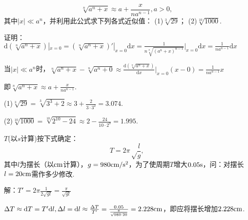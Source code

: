 \documentclass[12pt,UTF8]{ctexart}
\begin{document}
\begin{enumerate}
\[
\sqrt[n]{a^n+x}\approx a+\frac x{na^{n-1}},a>0,
\]
其中$|x|\ll a^n$，并利用此公式求下列各式近似值：
\newline
(1)$\sqrt[3]{29}$；
\newline
(2)$\sqrt[10]{1000}$.

证明：$\mathrm d(\sqrt[n]{a^n+x})|_{x=0}=(\sqrt[n]{a^n+x})'|_{x=0}\mathrm dx=\frac1{n\sqrt[n]{(a^n+x)^{n-1}}}|_{x=0}\mathrm dx=\frac1{na^{n-1}}\mathrm dx$

当$|x|\ll a^n$时，$\sqrt[n]{a^n+x}-\sqrt[n]{a^n+0}\approx\frac{\mathrm d(\sqrt[n]{a^n+x})}{\mathrm dx}|_{x=0}(x-0)=\frac1{na^{n-1}}x$

即$\sqrt[n]{a^n+x}\approx a+\frac x{na^{n-1}}$.

(1)$\sqrt[3]{29}=\sqrt[3]{3^3+2}\approx3+\frac2{3\cdot3^2}=3.074$.

(2)$\sqrt[10]{1000}=\sqrt[10]{2^{10}-24}\approx2-\frac{24}{10\cdot2^9}=1.995$.

$T$(以$s$计算)按下式确定：
\[
T=2\pi\sqrt\frac lg,
\]
其中$l$为摆长（以$\rm cm$计算），$g=980{\rm cm}/{\rm s}^2$，为了使周期$T$增大$0.05{\rm s}$，问：对摆长$l=20{\rm cm}$需作多少修改.

解：$T'=2\pi\frac1{2\sqrt{gl}}=\frac\pi{\sqrt{gl}}$

$\Delta T\approx \mathrm dT=T'\mathrm dl,\Delta l=\mathrm dl\approx\frac{\Delta T}{T'}=\frac{0.05}{\frac\pi{\sqrt{980\cdot20}}}=2.228\rm cm$，即应将摆长增加$2.228\rm cm$.
\end{enumerate}
\end{document}
